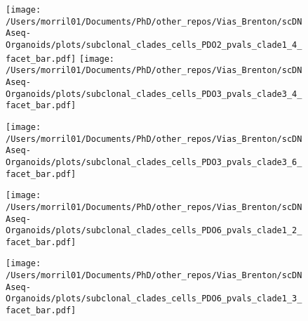 \documentclass{article}
\begin{document}
\captionsetup[subfigure]{labelformat=empty}

\large{

\begin{figure}[ht]

\hspace{.2in}
\hspace{.2in}

\vspace*{.3in}

 \texttt{[image: /Users/morril01/Documents/PhD/other\_repos/Vias\_Brenton/scDNAseq-Organoids/plots/subclonal\_clades\_cells\_PDO2\_pvals\_clade1\_4\_facet\_bar.pdf]}
 \texttt{[image: /Users/morril01/Documents/PhD/other\_repos/Vias\_Brenton/scDNAseq-Organoids/plots/subclonal\_clades\_cells\_PDO3\_pvals\_clade3\_4\_facet\_bar.pdf]}
 
 \texttt{[image: /Users/morril01/Documents/PhD/other\_repos/Vias\_Brenton/scDNAseq-Organoids/plots/subclonal\_clades\_cells\_PDO3\_pvals\_clade3\_6\_facet\_bar.pdf]}

 \texttt{[image: /Users/morril01/Documents/PhD/other\_repos/Vias\_Brenton/scDNAseq-Organoids/plots/subclonal\_clades\_cells\_PDO6\_pvals\_clade1\_2\_facet\_bar.pdf]}

 \texttt{[image: /Users/morril01/Documents/PhD/other\_repos/Vias\_Brenton/scDNAseq-Organoids/plots/subclonal\_clades\_cells\_PDO6\_pvals\_clade1\_3\_facet\_bar.pdf]}
\end{figure}

}
\end{document}
